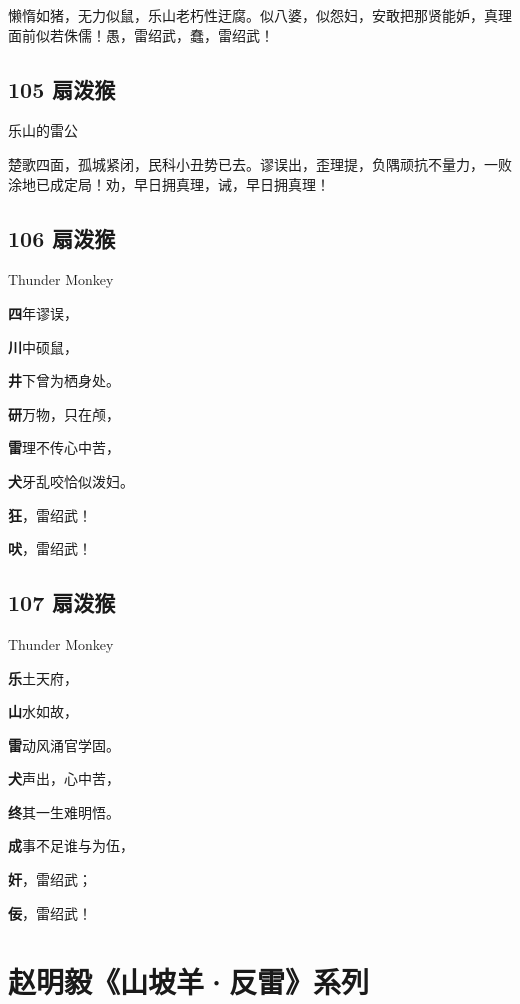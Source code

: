 懒惰如猪，无力似鼠，乐山老朽性迂腐。似八婆，似怨妇，安敢把那贤能妒，真理面前似若侏儒！愚，雷绍武，蠢，雷绍武！

\hypertarget{ux6247ux6cfcux7334-1}{%
\subsection{105 扇泼猴}\label{ux6247ux6cfcux7334-1}}

{乐山的雷公}

楚歌四面，孤城紧闭，民科小丑势已去。谬误出，歪理提，负隅顽抗不量力，一败涂地已成定局！劝，早日拥真理，诫，早日拥真理！

\hypertarget{ux6247ux6cfcux7334-2}{%
\subsection{106 扇泼猴}\label{ux6247ux6cfcux7334-2}}

{Thunder Monkey}

\textbf{四}年谬误，

\textbf{川}中硕鼠，

\textbf{井}下曾为栖身处。

\textbf{研}万物，只在颅，

\textbf{雷}理不传心中苦，

\textbf{犬}牙乱咬恰似泼妇。

\textbf{狂}，雷绍武！

\textbf{吠}，雷绍武！

\hypertarget{ux6247ux6cfcux7334-3}{%
\subsection{107 扇泼猴}\label{ux6247ux6cfcux7334-3}}

{Thunder Monkey}

\textbf{乐}土天府，

\textbf{山}水如故，

\textbf{雷}动风涌官学固。

\textbf{犬}声出，心中苦，

\textbf{终}其一生难明悟。

\textbf{成}事不足谁与为伍，

\textbf{奸}，雷绍武；

\textbf{佞}，雷绍武！

\hypertarget{ux8d75ux660eux6bc5ux5c71ux5761ux7f8aux53cdux96f7ux7cfbux5217}{%
\section{赵明毅《山坡羊·反雷》系列}\label{ux8d75ux660eux6bc5ux5c71ux5761ux7f8aux53cdux96f7ux7cfbux5217}}


